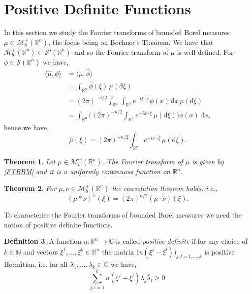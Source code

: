 \documentclass[a4paper, 12pt]{report}
\newtheorem{theorem}{Theorem}[section]
\theoremstyle{cor}
\theoremstyle{remark}
\theoremstyle{definition}
\newtheorem{defn}[theorem]{Definition}
\begin{document}
\section{Positive Definite Functions}\label{Se.PDF}

In this section we study the Fourier transforms of bounded Borel measures $\mu \in \mathcal{M}_b^+(\mathbb{R}^n)$, the focus being on Bochner's Theorem.  We have that $\mathcal{M}_b^+(\mathbb{R}^n) \subset \mathcal{S}'(\mathbb{R}^n)$ and so the Fourier transform of $\mu$ is well-defined.  For $\phi \in \mathcal{S}(\mathbb{R}^n)$ we have,
$$
\begin{aligned}
\langle\hat{\mu}, \phi\rangle & = \langle\mu, \hat{\phi}\rangle\\
& = \int_{\mathbb{R}^n}\hat{\phi}(\xi)\,\mu(\mathrm{d}\xi)\\
& = (2\pi)^{-n/2}\int_{\mathbb{R}^n}\int_{\mathbb{R}^n}e^{-i\xi\cdot x}\phi(x)\,\mathrm{d}x\,\mu(\mathrm{d}\xi)\\
& = \int_{\mathbb{R}^n}\bigg((2\pi)^{-n/2}\int_{\mathbb{R}^n}e^{-ix\cdot\xi}\,\mu(\mathrm{d}\xi)\bigg)\phi(x)\,\mathrm{d}x,
\end{aligned}
$$
hence we have,
\begin{equation}
\hat{\mu}(\xi) = (2\pi)^{-n/2}\int_{\mathbb{R}^n}e^{-ix\cdot\xi}\,\mu(\mathrm{d}\xi).\label{FTBBM}
\end{equation}

\begin{theorem}
Let $\mu \in \mathcal{M}_b^+(\mathbb{R}^n)$.  The Fourier transform of $\mu$ is given by \eqref{FTBBM} and it is a uniformly continuous function on $\mathbb{R}^n$.
\end{theorem}

\begin{theorem}
For $\mu, \nu \in \mathcal{M}_b^+(\mathbb{R}^n)$ the convolution theorem holds, i.e.,
\begin{equation}
(\mu\ast\nu)^\wedge(\xi) = (2\pi)^{n/2}(\hat{\mu}\cdot\hat{\nu})(\xi).
\end{equation}
\end{theorem}

To characterise the Fourier transforms of bounded Borel measures we need the notion of positive definite functions.
\begin{defn}
A function $u : \mathbb{R}^n \to \mathbb{C}$ is called \emph{positive definite} if for any choice of $k \in \mathbb{N}$ and vectors $\xi^1, \dots, \xi^k \in \mathbb{R}^n$ the matrix $\big(u(\xi^j - \xi^l)\big)_{j, l = 1, \dots, k}$ is positive Hermitian, i.e. for all $\lambda_1, \dots, \lambda_k \in \mathbb{C}$ we have,
\begin{equation}
\sum_{j, l = 1}^ku(\xi^j - \xi^l)\lambda_j\bar{\lambda}_l \ge 0.
\end{equation}
\end{defn}
\end{document}
